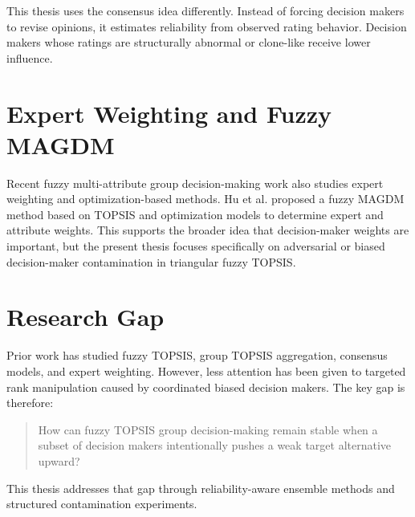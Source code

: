 This thesis uses the consensus idea differently. Instead of forcing decision makers to revise opinions, it estimates reliability from observed rating behavior. Decision makers whose ratings are structurally abnormal or clone-like receive lower influence.

\section{Expert Weighting and Fuzzy MAGDM}
Recent fuzzy multi-attribute group decision-making work also studies expert weighting and optimization-based methods. Hu et al. \cite{hu2023} proposed a fuzzy MAGDM method based on TOPSIS and optimization models to determine expert and attribute weights. This supports the broader idea that decision-maker weights are important, but the present thesis focuses specifically on adversarial or biased decision-maker contamination in triangular fuzzy TOPSIS.

\section{Research Gap}
Prior work has studied fuzzy TOPSIS, group TOPSIS aggregation, consensus models, and expert weighting. However, less attention has been given to targeted rank manipulation caused by coordinated biased decision makers. The key gap is therefore:

\begin{quote}
How can fuzzy TOPSIS group decision-making remain stable when a subset of decision makers intentionally pushes a weak target alternative upward?
\end{quote}

This thesis addresses that gap through reliability-aware ensemble methods and structured contamination experiments.
